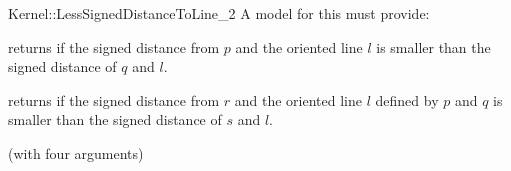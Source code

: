 \begin{ccRefFunctionObjectConcept}{Kernel::LessSignedDistanceToLine_2}
A model for this must provide:


{
returns  if the signed distance from $p$ and the oriented line $l$ 
is smaller than the signed distance of $q$ and $l$.
}

{
returns  if the signed distance from $r$ and the oriented line $l$ 
defined by $p$ and $q$ is smaller than the signed distance of $s$ and $l$.
}

\ccRefines
{} (with four arguments)

\ccSeeAlso
{}\\

\end{ccRefFunctionObjectConcept}
